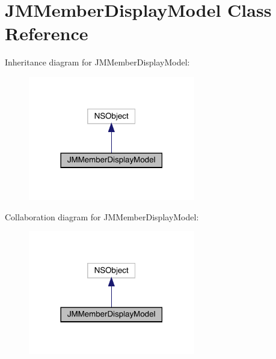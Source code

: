 \hypertarget{interface_j_m_member_display_model}{}\section{J\+M\+Member\+Display\+Model Class Reference}
\label{interface_j_m_member_display_model}


Inheritance diagram for J\+M\+Member\+Display\+Model\+:\nopagebreak
\begin{figure}[H]
\begin{center}
\leavevmode
\includegraphics[width=206pt]{interface_j_m_member_display_model__inherit__graph}
\end{center}
\end{figure}


Collaboration diagram for J\+M\+Member\+Display\+Model\+:\nopagebreak
\begin{figure}[H]
\begin{center}
\leavevmode
\includegraphics[width=206pt]{interface_j_m_member_display_model__coll__graph}
\end{center}
\end{figure}

